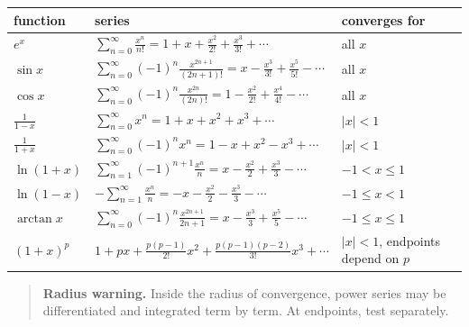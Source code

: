\begin{center}
\small
\renewcommand{\arraystretch}{2.0}
\begin{tabular}{p{}|p{}|p{}}
\textbf{function} & \textbf{series} & \textbf{converges for} \\ \hline

\(\displaystyle e^x\) &
\(\displaystyle
\sum_{n=0}^{\infty}\frac{x^n}{n!}
=
1+x+\frac{x^2}{2!}+\frac{x^3}{3!}+\cdots
\) &
all \(x\) \\

\(\displaystyle \sin x\) &
\(\displaystyle
\sum_{n=0}^{\infty}(-1)^n\frac{x^{2n+1}}{(2n+1)!}
=
x-\frac{x^3}{3!}+\frac{x^5}{5!}-\cdots
\) &
all \(x\) \\

\(\displaystyle \cos x\) &
\(\displaystyle
\sum_{n=0}^{\infty}(-1)^n\frac{x^{2n}}{(2n)!}
=
1-\frac{x^2}{2!}+\frac{x^4}{4!}-\cdots
\) &
all \(x\) \\

\(\displaystyle \frac1{1-x}\) &
\(\displaystyle
\sum_{n=0}^{\infty}x^n
=
1+x+x^2+x^3+\cdots
\) &
\(|x|<1\) \\

\(\displaystyle \frac1{1+x}\) &
\(\displaystyle
\sum_{n=0}^{\infty}(-1)^n x^n
=
1-x+x^2-x^3+\cdots
\) &
\(|x|<1\) \\

\(\displaystyle \ln(1+x)\) &
\(\displaystyle
\sum_{n=1}^{\infty}(-1)^{n+1}\frac{x^n}{n}
=
x-\frac{x^2}{2}+\frac{x^3}{3}-\cdots
\) &
\(-1<x\le1\) \\

\(\displaystyle \ln(1-x)\) &
\(\displaystyle
-\sum_{n=1}^{\infty}\frac{x^n}{n}
=
-x-\frac{x^2}{2}-\frac{x^3}{3}-\cdots
\) &
\(-1\le x<1\) \\

\(\displaystyle \arctan x\) &
\(\displaystyle
\sum_{n=0}^{\infty}(-1)^n\frac{x^{2n+1}}{2n+1}
=
x-\frac{x^3}{3}+\frac{x^5}{5}-\cdots
\) &
\(-1\le x\le1\) \\

\(\displaystyle (1+x)^p\) &
\(\displaystyle
1+px+\frac{p(p-1)}{2!}x^2+
\frac{p(p-1)(p-2)}{3!}x^3+\cdots
\) &
\(|x|<1\), endpoints depend on \(p\)
\end{tabular}
\end{center}

\begin{quote}
\textbf{Radius warning.}
Inside the radius of convergence, power series may be differentiated and integrated
term by term.  At endpoints, test separately.
\end{quote}

